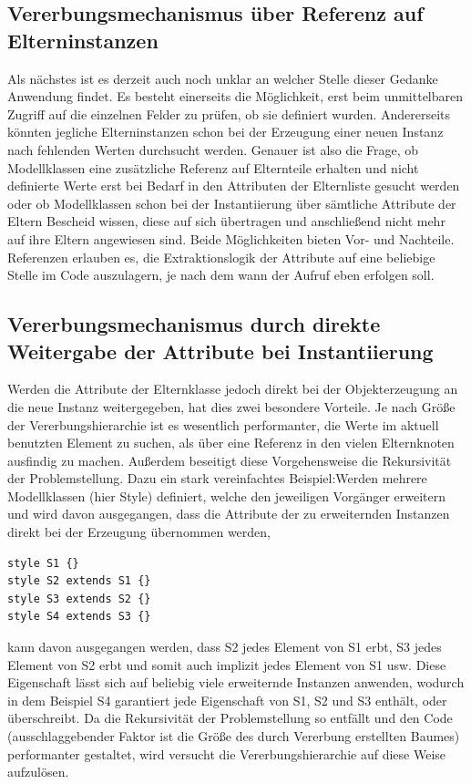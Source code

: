 \subsection{Vererbungsmechanismus über Referenz auf Elterninstanzen}
Als nächstes ist es derzeit auch noch unklar an welcher Stelle dieser Gedanke Anwendung findet. Es besteht einerseits die Möglichkeit, erst beim unmittelbaren Zugriff auf die einzelnen Felder zu prüfen, ob sie definiert wurden. Andererseits könnten jegliche Elterninstanzen schon bei der Erzeugung einer neuen Instanz nach fehlenden Werten durchsucht werden. Genauer ist also die Frage, ob Modellklassen eine zusätzliche Referenz auf Elternteile erhalten und nicht definierte Werte erst bei Bedarf in den Attributen der Elternliste gesucht werden oder ob Modellklassen schon bei der Instantiierung über sämtliche Attribute der Eltern Bescheid wissen, diese auf sich übertragen und anschließend nicht mehr auf ihre Eltern angewiesen sind. Beide Möglichkeiten bieten Vor- und Nachteile. Referenzen erlauben es, die Extraktionslogik der Attribute auf eine beliebige Stelle im Code auszulagern, je nach dem wann der Aufruf eben erfolgen soll. 
\subsection{Vererbungsmechanismus durch direkte Weitergabe der Attribute bei Instantiierung}
Werden die Attribute der Elternklasse jedoch direkt bei der Objekterzeugung an die neue Instanz weitergegeben, hat dies zwei besondere Vorteile. Je nach Größe der Vererbungshierarchie ist es wesentlich performanter, die Werte im aktuell benutzten Element zu suchen, als über eine Referenz in den vielen Elternknoten ausfindig zu machen. Außerdem beseitigt diese Vorgehensweise die Rekursivität der Problemstellung. Dazu ein stark vereinfachtes Beispiel:\linebreak Werden mehrere Modellklassen (hier Style) definiert, welche den jeweiligen Vorgänger erweitern und wird davon ausgegangen, dass die Attribute der zu erweiternden Instanzen direkt bei der Erzeugung übernommen werden,
\begin{lstlisting}[style=spray]
style S1 {}
style S2 extends S1 {}
style S3 extends S2 {}
style S4 extends S3 {}
\end{lstlisting}kann davon ausgegangen werden, dass S2 jedes Element von S1 erbt, S3 jedes Element von S2 erbt und somit auch implizit jedes Element von S1 usw. Diese Eigenschaft lässt sich auf beliebig viele erweiternde Instanzen anwenden, wodurch in dem Beispiel S4 garantiert jede Eigenschaft von S1, S2 und S3 enthält, oder überschreibt. Da die Rekursivität der Problemstellung so entfällt und den Code (ausschlaggebender Faktor ist die Größe des durch Vererbung erstellten Baumes) performanter gestaltet, wird versucht die Vererbungshierarchie auf diese Weise aufzulösen.

